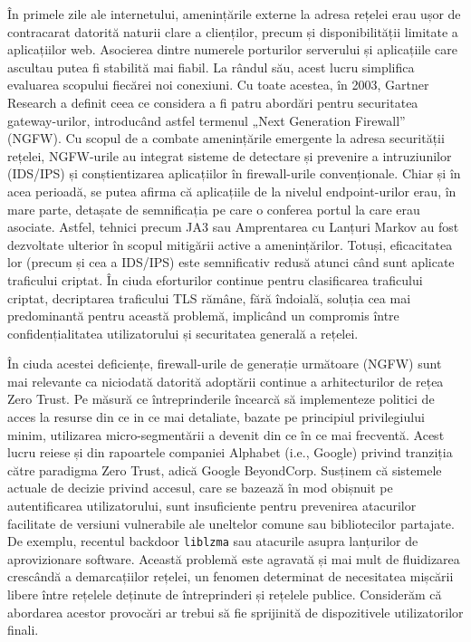 
În primele zile ale internetului, amenințările externe la adresa rețelei erau ușor de contracarat datorită naturii clare a clienților, precum și disponibilității limitate a aplicațiilor web. Asocierea dintre numerele porturilor serverului și aplicațiile care ascultau putea fi stabilită mai fiabil. La rândul său, acest lucru simplifica evaluarea scopului fiecărei noi conexiuni. Cu toate acestea, în 2003, Gartner Research a definit ceea ce considera a fi patru abordări pentru securitatea gateway-urilor, introducând astfel termenul „Next Generation Firewall” (NGFW). Cu scopul de a combate amenințările emergente la adresa securității rețelei, NGFW-urile au integrat sisteme de detectare și prevenire a intruziunilor (IDS/IPS) și conștientizarea aplicațiilor în firewall-urile convenționale. Chiar și în acea perioadă, se putea afirma că aplicațiile de la nivelul endpoint-urilor erau, în mare parte, detașate de semnificația pe care o conferea portul la care erau asociate. Astfel, tehnici precum JA3 sau Amprentarea cu Lanțuri Markov au fost dezvoltate ulterior în scopul mitigării active a amenințărilor. Totuși, eficacitatea lor (precum și cea a IDS/IPS) este semnificativ redusă atunci când sunt aplicate traficului criptat. În ciuda eforturilor continue pentru clasificarea traficului criptat, decriptarea traficului TLS rămâne, fără îndoială, soluția cea mai predominantă pentru această problemă, implicând un compromis între confidențialitatea utilizatorului și securitatea generală a rețelei.

În ciuda acestei deficiențe, firewall-urile de generație următoare (NGFW) sunt mai relevante ca niciodată datorită adoptării continue a arhitecturilor de rețea Zero Trust. Pe măsură ce întreprinderile încearcă să implementeze politici de acces la resurse din ce in ce mai detaliate, bazate pe principiul privilegiului minim, utilizarea micro-segmentării a devenit din ce în ce mai frecventă. Acest lucru reiese și din rapoartele companiei Alphabet (i.e., Google) privind tranziția către paradigma Zero Trust, adică Google BeyondCorp. Susținem că sistemele actuale de decizie privind accesul, care se bazează în mod obișnuit pe autentificarea utilizatorului, sunt insuficiente pentru prevenirea atacurilor facilitate de versiuni vulnerabile ale uneltelor comune sau bibliotecilor partajate. De exemplu, recentul backdoor \texttt{liblzma} sau atacurile asupra lanțurilor de aprovizionare software. Această problemă este agravată și mai mult de fluidizarea crescândă a demarcațiilor rețelei, un fenomen determinat de necesitatea mișcării libere între rețelele deținute de întreprinderi și rețelele publice. Considerăm că abordarea acestor provocări ar trebui să fie sprijinită de dispozitivele utilizatorilor finali.

